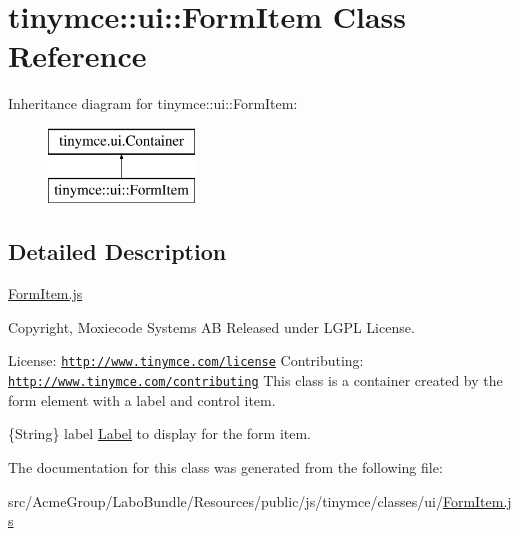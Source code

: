 \hypertarget{classtinymce_1_1ui_1_1_form_item}{\section{tinymce\+:\+:ui\+:\+:Form\+Item Class Reference}
\label{classtinymce_1_1ui_1_1_form_item}
}
Inheritance diagram for tinymce\+:\+:ui\+:\+:Form\+Item\+:\begin{figure}[H]
\begin{center}
\leavevmode
\includegraphics[height=2.000000cm]{classtinymce_1_1ui_1_1_form_item}
\end{center}
\end{figure}


\subsection{Detailed Description}
\hyperlink{_form_item_8js}{Form\+Item.\+js}

Copyright, Moxiecode Systems A\+B Released under L\+G\+P\+L License.

License\+: \href{http://www.tinymce.com/license}{\tt http\+://www.\+tinymce.\+com/license} Contributing\+: \href{http://www.tinymce.com/contributing}{\tt http\+://www.\+tinymce.\+com/contributing} This class is a container created by the form element with a label and control item.

\{String\} label \hyperlink{classtinymce_1_1ui_1_1_label}{Label} to display for the form item. 

The documentation for this class was generated from the following file\+:\begin{DoxyCompactItemize}
\item 
src/\+Acme\+Group/\+Labo\+Bundle/\+Resources/public/js/tinymce/classes/ui/\hyperlink{_form_item_8js}{Form\+Item.\+js}\end{DoxyCompactItemize}
